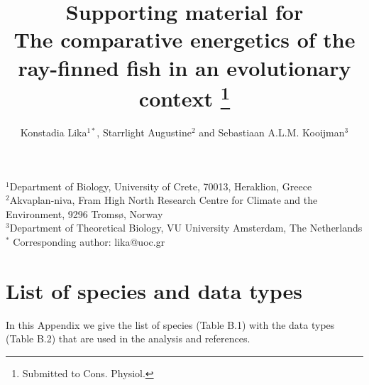 \documentclass{article}
\begin{document}
\captionsetup{width=15cm}

\title{Supporting material for\\ The comparative energetics of the ray-finned fish in an evolutionary context
\footnote{Submitted to Cons. Physiol.}}

\author{
        Konstadia Lika$^{1\ast}$,       
        Starrlight Augustine$^2$ and  
        Sebastiaan A.L.M. Kooijman$^3$ 
       }

\date{}

\maketitle
\noindent
{\small
{$^1$Department of Biology, University of Crete, 70013, Heraklion, Greece}\\
{$^2$Akvaplan-niva, Fram High North Research Centre for Climate and the Environment, 9296 Troms\o, Norway}\\
{$^3$Department of Theoretical Biology, VU University Amsterdam, The Netherlands}\\
{$^\ast$ Corresponding author: lika@uoc.gr}
}
\section{List of species and data types}

In this Appendix we give the list of species (Table B.1) with the data types (Table B.2) that are used in the analysis and references.






\end{document}
